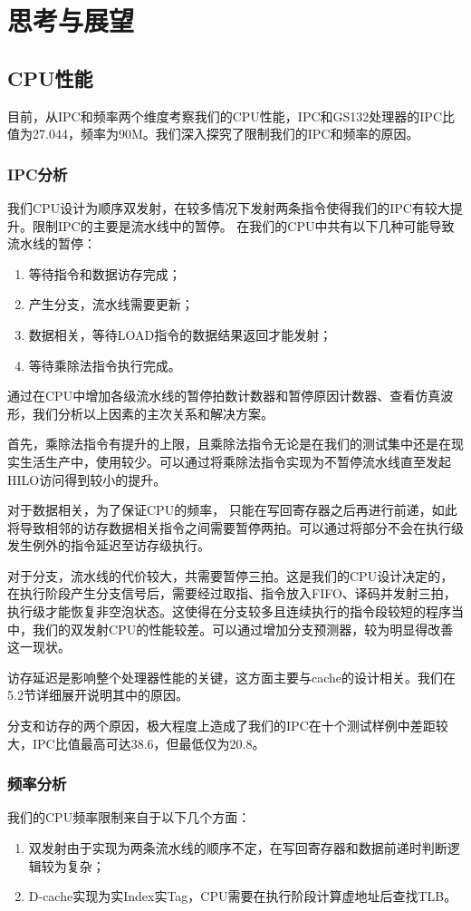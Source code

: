 \chapter{思考与展望}

\section{CPU性能}
目前，从IPC和频率两个维度考察我们的CPU性能，IPC和GS132处理器的IPC比值为27.044，频率为90M。我们深入探究了限制我们的IPC和频率的原因。

\subsection{IPC分析}
我们CPU设计为顺序双发射，在较多情况下发射两条指令使得我们的IPC有较大提升。限制IPC的主要是流水线中的暂停。
在我们的CPU中共有以下几种可能导致流水线的暂停：
\begin{enumerate}
    \item 等待指令和数据访存完成；
    \item 产生分支，流水线需要更新；
    \item 数据相关，等待LOAD指令的数据结果返回才能发射；
    \item 等待乘除法指令执行完成。
\end{enumerate}

通过在CPU中增加各级流水线的暂停拍数计数器和暂停原因计数器、查看仿真波形，我们分析以上因素的主次关系和解决方案。

首先，乘除法指令有提升的上限，且乘除法指令无论是在我们的测试集中还是在现实生活生产中，使用较少。可以通过将乘除法指令实现为不暂停流水线直至发起HILO访问得到较小的提升。

对于数据相关，为了保证CPU的频率， 只能在写回寄存器之后再进行前递，如此将导致相邻的访存数据相关指令之间需要暂停两拍。可以通过将部分不会在执行级发生例外的指令延迟至访存级执行。

对于分支，流水线的代价较大，共需要暂停三拍。这是我们的CPU设计决定的，在执行阶段产生分支信号后，需要经过取指、指令放入FIFO、译码并发射三拍，执行级才能恢复非空泡状态。这使得在分支较多且连续执行的指令段较短的程序当中，我们的双发射CPU的性能较差。可以通过增加分支预测器，较为明显得改善这一现状。

访存延迟是影响整个处理器性能的关键，这方面主要与cache的设计相关。我们在5.2节详细展开说明其中的原因。

分支和访存的两个原因，极大程度上造成了我们的IPC在十个测试样例中差距较大，IPC比值最高可达38.6，但最低仅为20.8。

\subsection{频率分析}
我们的CPU频率限制来自于以下几个方面：
\begin{enumerate}
    \item 双发射由于实现为两条流水线的顺序不定，在写回寄存器和数据前递时判断逻辑较为复杂；
    \item D-cache实现为实Index实Tag，CPU需要在执行阶段计算虚地址后查找TLB。
\end{enumerate}

